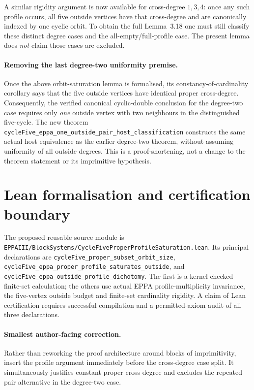 \documentclass[11pt,a4paper]{article}
\begin{document}
A similar rigidity argument is now available for
cross-degree \(1,3,4\): once any such profile occurs,
all five outside vertices have that cross-degree and
are canonically indexed by one cyclic orbit.
To obtain the full Lemma~3.18 one must still
classify these distinct degree cases and the
all-empty/full-profile case. The present lemma
does \emph{not} claim those cases are excluded.

\paragraph{Removing the last degree-two uniformity premise.}
Once the above orbit-saturation lemma is formalised, its
constancy-of-cardinality corollary says that the five
outside vertices have identical proper cross-degree.
Consequently, the verified canonical cyclic-double conclusion
for the degree-two case requires only \emph{one} outside
vertex with two neighbours in the distinguished five-cycle.
The new theorem
\texttt{cycleFive\_eppa\_one\_outside\_pair\_host\_classification}
constructs the same actual host equivalence as the earlier
degree-two theorem, without assuming uniformity of all
outside degrees. This is a proof-shortening, not a change to
the theorem statement or its imprimitive hypothesis.

\section*{Lean formalisation and certification boundary}
The proposed reusable source module is
\texttt{EPPAIII/BlockSystems/CycleFiveProperProfileSaturation.lean}.
Its principal declarations are
\texttt{cycleFive\_proper\_subset\_orbit\_size},
\texttt{cycleFive\_eppa\_proper\_profile\_saturates\_outside},
and \texttt{cycleFive\_eppa\_outside\_profile\_dichotomy}.
The first is a kernel-checked finite-set calculation;
the others use actual EPPA profile-multiplicity
invariance, the five-vertex outside budget and
finite-set cardinality rigidity. A claim of
Lean certification requires successful compilation
and a permitted-axiom audit of all three declarations.

\paragraph{Smallest author-facing correction.}
Rather than reworking the proof architecture around
blocks of imprimitivity, insert the profile argument
immediately before the cross-degree case split.
It simultaneously justifies constant proper
cross-degree and excludes the repeated-pair
alternative in the degree-two case.
\end{document}
